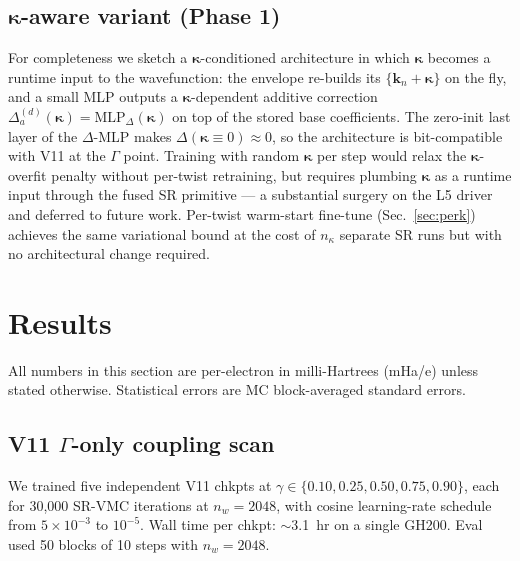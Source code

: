 \documentclass[reprint,amsmath,amssymb,aps,prb,floatfix,nofootinbib]{revtex4-2}
\begin{document}
\subsection{$\bm\kappa$-aware variant (Phase 1)}
For completeness we sketch a $\bm\kappa$-conditioned architecture
in which $\bm\kappa$ becomes a runtime input to the wavefunction:
the envelope re-builds its $\{\mathbf{k}_n + \bm\kappa\}$ on the
fly, and a small MLP outputs a $\bm\kappa$-dependent additive
correction
$\Delta_a^{(d)}(\bm\kappa) = \mathrm{MLP}_\Delta(\bm\kappa)$ on
top of the stored base coefficients.  The zero-init last layer of
the $\Delta$-MLP makes $\Delta(\bm\kappa\equiv 0) \approx 0$, so
the architecture is bit-compatible with V11 at the $\Gamma$ point.
Training with random $\bm\kappa$ per step would relax the
$\bm\kappa$-overfit penalty without per-twist retraining, but
requires plumbing $\bm\kappa$ as a runtime input through the
fused SR primitive — a substantial surgery on the L5 driver and
deferred to future work.  Per-twist warm-start fine-tune
(Sec.~\ref{sec:perk}) achieves the same variational bound at the
cost of $n_\kappa$ separate SR runs but with no architectural
change required.

\section{Results}\label{sec:results}
All numbers in this section are per-electron in milli-Hartrees
(mHa/e) unless stated otherwise.  Statistical errors are MC
block-averaged standard errors.

\subsection{V11 $\Gamma$-only coupling scan}\label{sec:results-gamma}
We trained five independent V11 chkpts at
$\gamma\in\{0.10, 0.25, 0.50, 0.75, 0.90\}$, each for 30{,}000
SR-VMC iterations at $n_w = 2048$, with cosine learning-rate
schedule from $5\times10^{-3}$ to $10^{-5}$.  Wall time per
chkpt: $\sim$3.1~hr on a single GH200.  Eval used 50 blocks of
10 steps with $n_w = 2048$.
\end{document}
